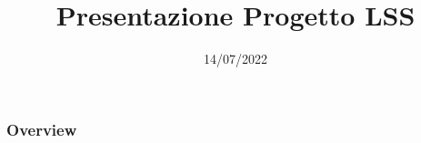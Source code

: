 \documentclass[
    11pt, %
]{beamer}
\title[LSS]{Presentazione Progetto LSS}
\author[]{}
\date[14/07/2022]{14/07/2022}
\begin{document}
    \begin{frame}
        \titlepage
    \end{frame}

    \begin{frame}
        \frametitle{Overview}
        \tableofcontents
    \end{frame}
\end{document}
